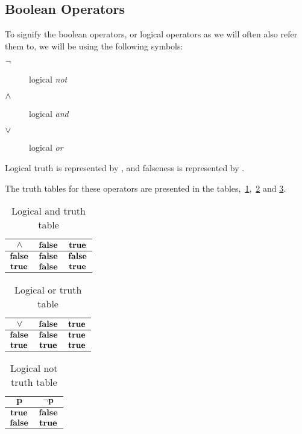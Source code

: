 \subsection{Boolean Operators}
\label{sec:boolean-operators}

To signify the boolean operators, or logical operators as we will often
also refer them to, we will be using the following symbols:

\begin{description}
\item[$\neg$] logical \textit{not}
\item[$\wedge$] logical \textit{and}
\item[$\vee$] logical \textit{or}
\end{description}

Logical truth is represented by \True, and falseness is represented by
\False.

The truth tables for these operators are presented in the
tables,~\ref{tab:log-and-table},~\ref{tab:log-or-table} and
\ref{tab:log-not-table}.

\begin{table}
  \centering
  \begin{tabular}{|c|c|c|}
    \hline
    $\mathbf{\wedge}$ & $\mathbf{\textbf{false}}$ & $\mathbf{\textbf{true}}$ \\ \hline
    $\mathbf{\textbf{false}}$ & $\mathbf{\textbf{false}}$ & $\mathbf{\textbf{false}}$ \\ \hline
    $\mathbf{\textbf{true}}$ & $\mathbf{\textbf{false}}$ & $\mathbf{\textbf{true}}$ \\ \hline
  \end{tabular}
  \caption{Logical and truth table}
  \label{tab:log-and-table}
\end{table}

\begin{table}
  \centering
  \begin{tabular}{|c|c|c|}
    \hline
    $\mathbf{\vee}$ & $\mathbf{\textbf{false}}$ & $\mathbf{\textbf{true}}$ \\ \hline
    $\mathbf{\textbf{false}}$ & $\textbf{false}$ & $\textbf{true}$ \\ \hline
    $\mathbf{\textbf{true}}$ & $\textbf{true}$ & $\textbf{true}$ \\ \hline
  \end{tabular}
  \caption{Logical or truth table}
  \label{tab:log-or-table}
\end{table}

\begin{table}
  \centering
  \begin{tabular}{|c|c|}
    \hline
    $\mathbf{p}$ & $\mathbf{\neg p}$ \\ \hline
    $\textbf{true}$ & $\textbf{false}$ \\ \hline
    $\textbf{false}$ & $\textbf{true}$ \\ \hline
  \end{tabular}
  \caption{Logical not truth table}
  \label{tab:log-not-table}
\end{table}

